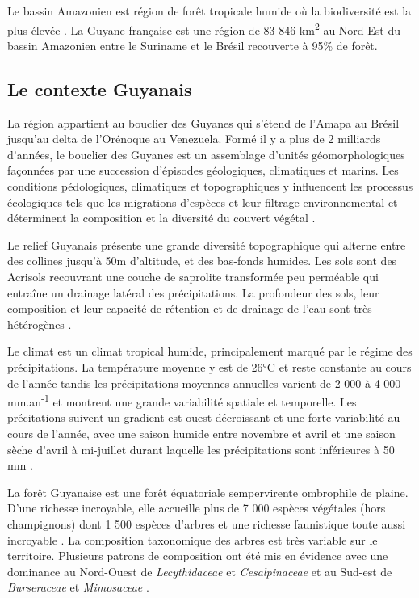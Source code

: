 \documentclass[
  11pt,
  french,
  A4paper,
  extrafontsizes,onecolumn,openright
  ]{memoir}
\begin{document}
Le bassin Amazonien est région de forêt tropicale humide où la
biodiversité est la plus élevée \autocite{Gentry1988}. La Guyane
française est une région de 83 846 km\textsuperscript{2} au Nord-Est du
bassin Amazonien entre le Suriname et le Brésil recouverte à 95\% de
forêt.

\subsection{Le contexte Guyanais}\label{le-contexte-guyanais}

La région appartient au bouclier des Guyanes qui s'étend de l'Amapa au
Brésil jusqu'au delta de l'Orénoque au Venezuela. Formé il y a plus de 2
milliards d'années, le bouclier des Guyanes est un assemblage d'unités
géomorphologiques façonnées par une succession d'épisodes géologiques,
climatiques et marins. Les conditions pédologiques, climatiques et
topographiques y influencent les processus écologiques tels que les
migrations d'espèces et leur filtrage environnemental et déterminent la
composition et la diversité du couvert végétal \autocite{Guitet2015}.

Le relief Guyanais présente une grande diversité topographique qui
alterne entre des collines jusqu'à 50m d'altitude, et des bas-fonds
humides. Les sols sont des Acrisols recouvrant une couche de saprolite
transformée peu perméable qui entraîne un drainage latéral des
précipitations. La profondeur des sols, leur composition et leur
capacité de rétention et de drainage de l'eau sont très hétérogènes
\autocites{Ferry2010}{Robert2003}.

Le climat est un climat tropical humide, principalement marqué par le
régime des précipitations. La température moyenne y est de 26°C et reste
constante au cours de l'année tandis les précipitations moyennes
annuelles varient de 2 000 à 4 000 mm.an\textsuperscript{-1} et montrent
une grande variabilité spatiale et temporelle. Les précitations suivent
un gradient est-ouest décroissant et une forte variabilité au cours de
l'année, avec une saison humide entre novembre et avril et une saison
sèche d'avril à mi-juillet durant laquelle les précipitations sont
inférieures à 50 mm \autocite{Wagner2011}.

La forêt Guyanaise est une forêt équatoriale sempervirente ombrophile de
plaine. D'une richesse incroyable, elle accueille plus de 7 000 espèces
végétales (hors champignons) dont 1 500 espèces d'arbres et une richesse
faunistique toute aussi incroyable \autocite{DeNoter2008}. La
composition taxonomique des arbres est très variable sur le territoire.
Plusieurs patrons de composition ont été mis en évidence avec une
dominance au Nord-Ouest de \emph{Lecythidaceae} et \emph{Cesalpinaceae}
et au Sud-est de \emph{Burseraceae} et \emph{Mimosaceae}
\autocites{Sabatier1989}{Sabatier199}{Guitet2015}.
\end{document}
